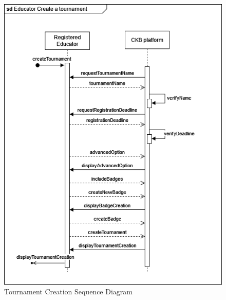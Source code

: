 \begin{center}
    \begin{figure} [H]
        \begin{center}
            \includegraphics[width=0.9\linewidth]{Images/SequenceDiagrams/SD_10.png}
            \caption{Tournament Creation Sequence Diagram}
            \label{fig: tournament_creation_seq_diag}
        \end{center}
    \end{figure}
\end{center}

\newpage
